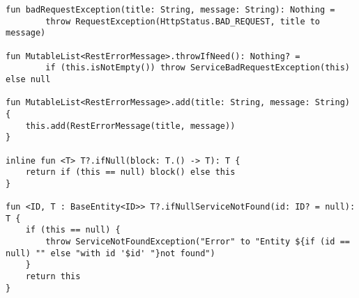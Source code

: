 \begin{lstlisting}[style = ktstyle]
fun badRequestException(title: String, message: String): Nothing =
        throw RequestException(HttpStatus.BAD_REQUEST, title to message)

fun MutableList<RestErrorMessage>.throwIfNeed(): Nothing? =
        if (this.isNotEmpty()) throw ServiceBadRequestException(this) else null

fun MutableList<RestErrorMessage>.add(title: String, message: String) {
    this.add(RestErrorMessage(title, message))
}

inline fun <T> T?.ifNull(block: T.() -> T): T {
    return if (this == null) block() else this
}

fun <ID, T : BaseEntity<ID>> T?.ifNullServiceNotFound(id: ID? = null): T {
    if (this == null) {
        throw ServiceNotFoundException("Error" to "Entity ${if (id == null) "" else "with id '$id' "}not found")
    }
    return this
}

\end{lstlisting}